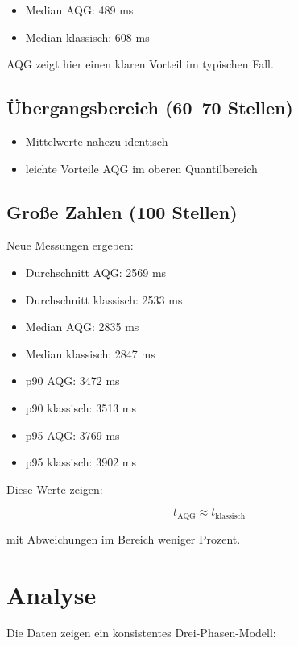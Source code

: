 \documentclass[11pt,a4paper]{article}
\begin{document}
	\begin{itemize}
		\item Median AQG: 489 ms
		\item Median klassisch: 608 ms
	\end{itemize}
	
	AQG zeigt hier einen klaren Vorteil im typischen Fall.
	
	\subsection{Übergangsbereich (60–70 Stellen)}
	
	\begin{itemize}
		\item Mittelwerte nahezu identisch
		\item leichte Vorteile AQG im oberen Quantilbereich
	\end{itemize}
	
	\subsection{Große Zahlen (100 Stellen)}
	
	Neue Messungen ergeben:
	
	\begin{itemize}
		\item Durchschnitt AQG: 2569 ms
		\item Durchschnitt klassisch: 2533 ms
		\item Median AQG: 2835 ms
		\item Median klassisch: 2847 ms
		\item p90 AQG: 3472 ms
		\item p90 klassisch: 3513 ms
		\item p95 AQG: 3769 ms
		\item p95 klassisch: 3902 ms
	\end{itemize}
	
	Diese Werte zeigen:
	
	\begin{equation}
		t_{\text{AQG}} \approx t_{\text{klassisch}}
	\end{equation}
	
	mit Abweichungen im Bereich weniger Prozent.
	
	\section{Analyse}
	
	Die Daten zeigen ein konsistentes Drei-Phasen-Modell:
	
\end{document}
